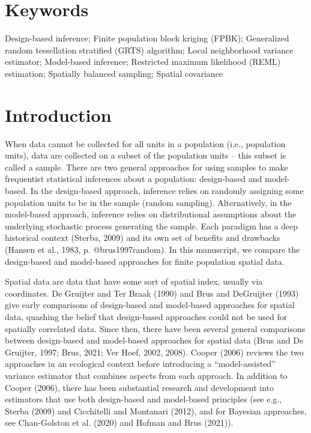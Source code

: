 \documentclass[]{elsarticle} %
\begin{document}
\hypertarget{keywords}{%
\section*{Keywords}\label{keywords}}

Design-based inference; Finite population block kriging (FPBK);
Generalized random tessellation stratified (GRTS) algorithm; Local
neighborhood variance estimator; Model-based inference; Restricted
maximum likelihood (REML) estimation; Spatially balanced sampling;
Spatial covariance

\hypertarget{sec:introduction}{%
\section{Introduction}\label{sec:introduction}}

When data cannot be collected for all units in a population (i.e.,
population units), data are collected on a subset of the population
units -- this subset is called a sample. There are two general
approaches for using samples to make frequentist statistical inferences
about a population: design-based and model-based. In the design-based
approach, inference relies on randomly assigning some population units
to be in the sample (random sampling). Alternatively, in the model-based
approach, inference relies on distributional assumptions about the
underlying stochastic process generating the sample. Each paradigm has a
deep historical context (Sterba, 2009) and its own set of benefits and
drawbacks (Hansen et al., 1983, p. @brus1997random). In this manuscript,
we compare the design-based and model-based approaches for finite
population spatial data.

Spatial data are data that have some sort of spatial index, usually via
coordinates. De Gruijter and Ter Braak (1990) and Brus and DeGruijter
(1993) give early comparisons of design-based and model-based approaches
for spatial data, quashing the belief that design-based approaches could
not be used for spatially correlated data. Since then, there have been
several general comparisons between design-based and model-based
approaches for spatial data (Brus and De Gruijter, 1997; Brus, 2021; Ver
Hoef, 2002, 2008). Cooper (2006) reviews the two approaches in an
ecological context before introducing a ``model-assisted'' variance
estimator that combines aspects from each approach. In addition to
Cooper (2006), there has been substantial research and development into
estimators that use both design-based and model-based principles (see
e.g., Sterba (2009) and Cicchitelli and Montanari (2012), and for
Bayesian approaches, see Chan-Golston et al. (2020) and Hofman and Brus
(2021)).
\end{document}

